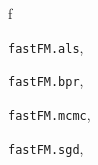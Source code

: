 \documentclass[letterpaper,10pt,english]{sphinxmanual}
\begin{document}
\renewcommand{\indexname}{Python Module Index}
\begin{theindex}
\def\bigletter#1{{\Large\sffamily#1}\nopagebreak\vspace{1mm}}
\bigletter{f}
\item {\texttt{fastFM.als}}, \pageref{api:module-fastFM.als}
\item {\texttt{fastFM.bpr}}, \pageref{api:module-fastFM.bpr}
\item {\texttt{fastFM.mcmc}}, \pageref{api:module-fastFM.mcmc}
\item {\texttt{fastFM.sgd}}, \pageref{api:module-fastFM.sgd}
\end{theindex}

\renewcommand{\indexname}{Index}
\printindex
\end{document}
